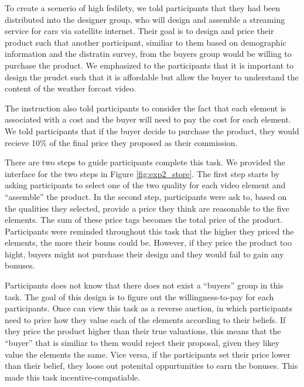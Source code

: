 To create a scenerio of high fedilety, we told participants that they had been distributed into the designer group, who will design and assemble a streaming service for cars via satellite internet. Their goal is to design and price their product such that another participant, similiar to them based on demographic information and the distratin survey, from the buyers group would be willing to purchase the product. We emphasized to the participants that it is important to design the prudct such that it is affordable but allow the buyer to understand the content of the weather forcast video.

The instruction also told participants to consider the fact that each element is associated with a cost and the buyer will need to pay the cost for each element. We told participants that if the buyer decide to purchase the product, they would recieve 10\% of the final price they proposed as their commission. 

There are two steps to guide participants complete this task. We provided the interface for the two steps in Figure \ref{fig:exp2_store}. The first step starts by asking participants to select one of the two quality for each video element and ``assemble'' the product. In the second step, participants were ask to, based on the qualities they selected, provide a price they think are reasonable to the five elements. The sum of these price tags becomes the total price of the product. Participants were reminded throughout this task that the higher they priced the elements, the more their bonus could be. However, if they price the product too hight, buyers might not purchase their design and they would fail to gain any bonuses. 

Participants does not know that there does not exist a ``buyers'' group in this task. The goal of this design is to figure out the willingness-to-pay for each participants. Once can view this task as a reverse auction, in which participants need to price how they value each of the elements according to their beliefs. If they price the product higher than their true valuations, this means that the ``buyer'' that is similiar to them would reject their proposal, given they likey value the elements the same. Vice versa, if the participants set their price lower than their belief, they loose out potenital oppurtunities to earn the bonuses. This made this task incentive-compatiable. 

